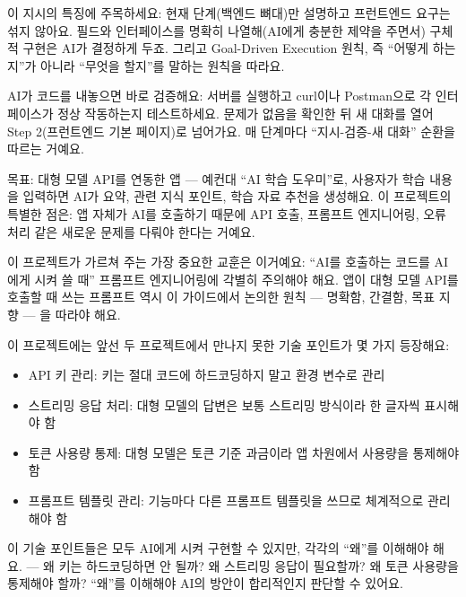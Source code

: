 이 지시의 특징에 주목하세요: 현재 단계(백엔드 뼈대)만 설명하고 프런트엔드 요구는 섞지 않아요. 필드와 인터페이스를 명확히 나열해(AI에게 충분한 제약을 주면서) 구체적 구현은 AI가 결정하게 두죠. 그리고 Goal-Driven Execution 원칙, 즉 “어떻게 하는지”가 아니라 “무엇을 할지”를 말하는 원칙을 따라요.

AI가 코드를 내놓으면 바로 검증해요: 서버를 실행하고 curl이나 Postman으로 각 인터페이스가 정상 작동하는지 테스트하세요. 문제가 없음을 확인한 뒤 새 대화를 열어 Step 2(프런트엔드 기본 페이지)로 넘어가요. 매 단계마다 “지시-검증-새 대화” 순환을 따르는 거예요.



목표: 대형 모델 API를 연동한 앱 — 예컨대 “AI 학습 도우미”로, 사용자가 학습 내용을 입력하면 AI가 요약, 관련 지식 포인트, 학습 자료 추천을 생성해요. 이 프로젝트의 특별한 점은: 앱 자체가 AI를 호출하기 때문에 API 호출, 프롬프트 엔지니어링, 오류 처리 같은 새로운 문제를 다뤄야 한다는 거예요.

이 프로젝트가 가르쳐 주는 가장 중요한 교훈은 이거예요: “AI를 호출하는 코드를 AI에게 시켜 쓸 때” 프롬프트 엔지니어링에 각별히 주의해야 해요. 앱이 대형 모델 API를 호출할 때 쓰는 프롬프트 역시 이 가이드에서 논의한 원칙 — 명확함, 간결함, 목표 지향 — 을 따라야 해요.


이 프로젝트에는 앞선 두 프로젝트에서 만나지 못한 기술 포인트가 몇 가지 등장해요:

\begin{itemize}
  \item API 키 관리: 키는 절대 코드에 하드코딩하지 말고 환경 변수로 관리
  \item 스트리밍 응답 처리: 대형 모델의 답변은 보통 스트리밍 방식이라 한 글자씩 표시해야 함
  \item 토큰 사용량 통제: 대형 모델은 토큰 기준 과금이라 앱 차원에서 사용량을 통제해야 함
  \item 프롬프트 템플릿 관리: 기능마다 다른 프롬프트 템플릿을 쓰므로 체계적으로 관리해야 함
\end{itemize}

이 기술 포인트들은 모두 AI에게 시켜 구현할 수 있지만, 각각의 “왜”를 이해해야 해요. — 왜 키는 하드코딩하면 안 될까? 왜 스트리밍 응답이 필요할까? 왜 토큰 사용량을 통제해야 할까? “왜”를 이해해야 AI의 방안이 합리적인지 판단할 수 있어요.


